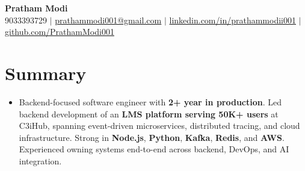 \documentclass[letterpaper,10pt]{article}
\begin{document}
\begin{center}
{\Huge \textbf{Pratham Modi}} \\
\vspace{5pt}
\small
9033393729 $|$
\href{mailto:prathammodi001@gmail.com}{prathammodi001@gmail.com} $|$
\href{https://www.linkedin.com/in/prathammodii001/}{linkedin.com/in/prathammodii001} $|$
\href{https://github.com/PrathamModi001}{github.com/PrathamModi001}
\end{center}

\vspace{-20pt}
\section{Summary}
\begin{itemize}[leftmargin=*]
\item Backend-focused software engineer with \textbf{2+ year in production}. Led backend development of an \textbf{LMS platform serving 50K+ users} at C3iHub, spanning event-driven microservices, distributed tracing, and cloud infrastructure. Strong in \textbf{Node.js}, \textbf{Python}, \textbf{Kafka}, \textbf{Redis}, and \textbf{AWS}. Experienced owning systems end-to-end across backend, DevOps, and AI integration.
\end{itemize}

\vspace{-12pt}
\end{document}
